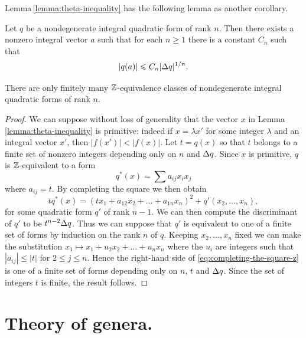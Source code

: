 Lemma\,\ref{lemma:theta-inequality} has the following lemma as another corollary.

\begin{lemmax}
    {\normalfont \cite[p.\,135]{cassels2008rational}}
    Let \(q\) be a nondegenerate integral quadratic form of rank \(n\). Then there exists a nonzero integral vector \(a\) such that for each \(n \geq 1\) there is a constant \(C_n\) such that
    \[
        |q(a)| \leqslant C_n |{\Delta} q|^{1/n}.
    \]
\end{lemmax}

\begin{theorem}
    {\normalfont \cite[p.\,129]{cassels2008rational}}
    There are only finitely many \(\mathbb{Z}\)-equivalence classes of nondegenerate integral quadratic forms of rank \(n\).
\end{theorem}

\begin{proof}
    We can suppose without loss of generality that the vector \(x\) in Lemma\,\ref{lemma:theta-inequality} is primitive: indeed if \(x = \lambda x'\) for some integer \(\lambda\) and an integral vector \(x'\), then \(|f(x')| < |f(x)|\). Let \(t = q(x)\) so that \(t\) belongs to a finite set of nonzero integers depending only on \(n\) and \({\Delta} q\). Since \(x\) is primitive, \(q\) is \(\mathbb{Z}\)-equivalent to a form
    \[
        q^*(x) = \sum a_{ij}x_i x_j
    \]
    where \(a_{ij} = t\). By completing the square we then obtain
    \begin{equation}\label{eq:completing-the-square-z}
        tq^*(x) = (tx_1 + a_{12}x_2 + \dots + a_{1n}x_n)^2 + q'(x_2, \dots, x_n),
    \end{equation}
    for some quadratic form \(q'\) of rank \(n-1\). We can then compute the discriminant of \(q'\) to be \(t^{n-2} {\Delta} q\). Thus we can suppose that \(q'\) is equivalent to one of a finite set of forms by induction on the rank \(n\) of \(q\). Keeping \(x_2, \dots, x_n\) fixed we can make the substitution \(x_1 \mapsto x_1 + u_2 x_2 + \dots + u_n x_n\) where the \(u_i\) are integers such that \(|a_{ij}| \leq |t|\) for \(2 \leq j \leq n\). Hence the right-hand side of \eqref{eq:completing-the-square-z} is one of a finite set of forms depending only on \(n\), \(t\) and \({\Delta} q\). Since the set of integers \(t\) is finite, the result follows.
\end{proof}


\section{Theory of genera.}

